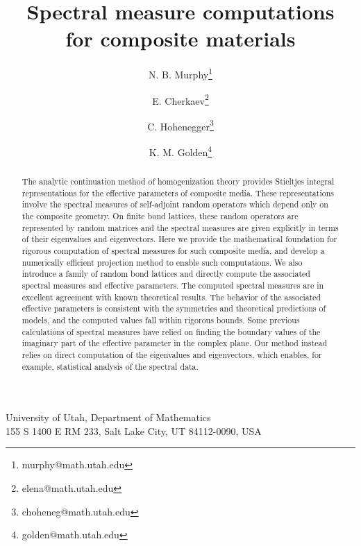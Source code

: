 \documentclass{cmslatex}
\begin{document}
\title{Spectral measure computations \\ for composite materials}
%
\author{N. B. Murphy\thanks {murphy@math.utah.edu}
%
\and E. Cherkaev\thanks {elena@math.utah.edu}
%
\and C. Hohenegger\thanks {choheneg@math.utah.edu}
%
\and K. M. Golden\thanks {golden@math.utah.edu}
}



\pagestyle{myheadings} \maketitle


\begin{center}
University of Utah, Department of Mathematics \\ 155 S 1400 E
  RM 233, Salt Lake City, UT 84112-0090, USA
\end{center}

\vspace{3ex}


\begin{abstract}
The analytic continuation method of homogenization theory provides
Stieltjes integral representations for the effective parameters of
composite media. These representations involve the spectral measures of self-adjoint random
operators which depend only on the composite geometry. On finite bond
lattices, these random operators are represented by random matrices
and the spectral measures are given explicitly in terms of their
eigenvalues and eigenvectors. Here we provide the mathematical
foundation for rigorous computation of spectral measures for such
composite media, and develop a numerically efficient projection method
to enable such computations. We also introduce a family of
random bond lattices and directly compute the associated spectral
measures and effective parameters. The computed spectral
measures are in excellent agreement with known theoretical
results. The behavior of the associated effective parameters is consistent with
the symmetries and theoretical predictions of models, and the computed values 
fall within rigorous bounds. Some previous calculations of spectral measures
have relied on finding the boundary values of the imaginary part of the 
effective parameter in the complex plane. Our method
instead relies on direct computation of the eigenvalues and eigenvectors, 
which enables, for example, statistical analysis of the spectral data.   
\end{abstract}
\end{document}
